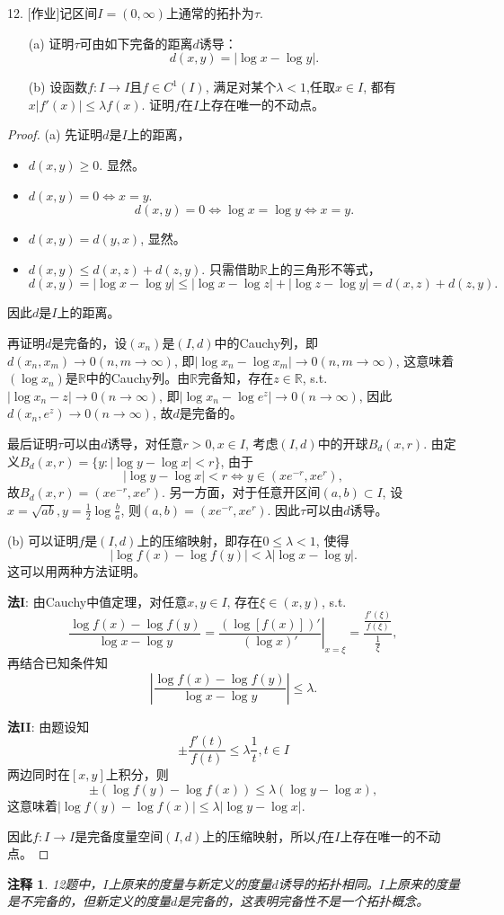 \documentclass[a4paper,8pt]{ctexart}\textwidth 140mm \textheight 216mm
\newtheorem{Remark}{注释}[section]
\newcommand{\8}{\infty}
\begin{document}
12. [作业]记区间$I=(0,\infty)$上通常的拓扑为$\tau$.
\begin{enumerate}
	\item[(a)] 证明$\tau$可由如下完备的距离$d$诱导：
	$$d(x,y)=|\log x-\log y|.$$
	\item[(b)] 设函数$f:I\to I$且$f\in C^1(I)$, 满足对某个$\lambda<1$,任取$x\in I$, 都有$x|f'(x)|\leq \lambda f(x)$. 证明$f$在$I$上存在唯一的不动点。
\end{enumerate}
\begin{proof}
	(a) 先证明$d$是$I$上的距离，
	\begin{itemize}
		\item $d(x,y)\geq 0$. 显然。
		\item $d(x,y)=0\Leftrightarrow x=y$.  
		$$d(x,y)=0\Leftrightarrow \log x=\log y\Leftrightarrow x=y.$$
		\item $d(x,y)=d(y,x)$, 显然。
		\item $d(x,y)\leq d(x,z)+d(z,y)$. 只需借助$\mathbb{R}$上的三角形不等式，
		$$d(x,y)=|\log x-\log y|\leq |\log x-\log z|+|\log z-\log y|=d(x,z)+d(z,y).$$ 
	\end{itemize}
    因此$d$是$I$上的距离。
    
    再证明$d$是完备的，设$(x_n)$是$(I,d)$中的Cauchy列，即$d(x_n,x_m)\to 0(n,m\to\infty)$, 即$|\log x_n-\log x_m|\to 0(n,m\to \infty)$, 这意味着$(\log x_n)$是$\mathbb{R}$中的Cauchy列。由$\mathbb{R}$完备知，存在$z\in\mathbb{R}$, s.t. $|\log x_n-z|\to 0(n\to \infty)$, 即$|\log x_n-\log e^z|\to 0(n\to \infty)$, 因此$d(x_n,e^z)\to 0(n\to\infty)$, 故$d$是完备的。
    
    最后证明$\tau$可以由$d$诱导，对任意$r>0,x\in I$, 考虑$(I,d)$中的开球$B_d(x,r)$. 由定义$B_d(x,r)=\{y:|\log y-\log x|<r\}$, 由于
    $$|\log y-\log x|<r\Leftrightarrow y\in(xe^{-r},xe^r),$$
    故$B_d(x,r)=(xe^{-r},xe^r)$. 另一方面，对于任意开区间$(a,b)\subset I$, 设$x=\sqrt{ab}, y=\frac{1}{2}\log \frac{b}{a}$, 则$(a,b)=(xe^{-r},xe^r)$. 因此$\tau$可以由$d$诱导。
    
    (b) 可以证明$f$是$(I,d)$上的压缩映射，即存在$0\leq \lambda<1$, 使得
    $$|\log f(x)-\log f(y)|<\lambda|\log x-\log y|.$$
    这可以用两种方法证明。
    
    \textbf{法I}: 由Cauchy中值定理，对任意$x,y\in I$, 存在$\xi\in(x,y)$, s.t.
    $$\frac{\log f(x)-\log f(y)}{\log x-\log y}=\left.\frac{(\log[f(x)])'}{(\log x)'}\right|_{x=\xi}=\frac{\frac{f'(\xi)}{f(\xi)}}{\frac{1}{\xi}},$$
    再结合已知条件知
    $$\left|\frac{\log f(x)-\log f(y)}{\log x-\log y}\right|\leq \lambda.$$
    
    \textbf{法II}: 由题设知
    $$\pm \frac{f'(t)}{f(t)}\leq \lambda \frac{1}{t}, t\in I$$
    两边同时在$[x,y]$上积分，则
    $$\pm (\log f(y)-\log f(x))\leq \lambda(\log y-\log x),$$
    这意味着$|\log f(y)-\log f(x)|\leq \lambda|\log y-\log x|$.
    
    因此$f:I\to I$是完备度量空间$(I,d)$上的压缩映射，所以$f$在$I$上存在唯一的不动点。
\end{proof}
\begin{Remark}
	12题中，$I$上原来的度量与新定义的度量$d$诱导的拓扑相同。$I$上原来的度量是不完备的，但新定义的度量$d$是完备的，这表明完备性不是一个拓扑概念。
\end{Remark}
\end{document}
